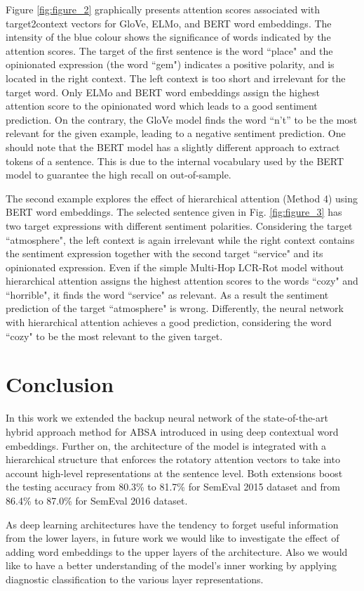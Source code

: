 \documentclass[hidelinks]{llncs}
\begin{document}
Figure \ref{fig:figure_2} graphically presents attention scores associated with target2context vectors for GloVe, ELMo, and BERT word embeddings. The intensity of the blue colour shows the significance of words indicated by the attention scores. The target of the first sentence is the word ``place" and the opinionated expression (the word ``gem") indicates a positive polarity, and is located in the right context. The left context is too short and irrelevant for the target word. Only ELMo and BERT word embeddings assign the highest attention score to the opinionated word which leads to a good sentiment prediction. On the contrary, the GloVe model finds the word ``n't'' to be the most relevant for the given example, leading to a negative sentiment prediction. One should note that the BERT model has a slightly different approach to extract tokens of a sentence. This is due to the internal vocabulary used by the BERT model to guarantee the high recall on out-of-sample.

The second example explores the effect of hierarchical attention (Method 4) using BERT word embeddings. The selected sentence given in Fig. \ref{fig:figure_3} has two target expressions with different sentiment polarities. Considering the target ``atmosphere", the left context is again irrelevant while the right context contains the sentiment expression together with the second target ``service" and its opinionated expression. Even if the simple Multi-Hop LCR-Rot model without hierarchical attention assigns the highest attention scores to the words ``cozy" and ``horrible", it finds the word ``service" as relevant. As a result the sentiment prediction of the target ``atmosphere" is wrong. Differently, the neural network with hierarchical attention achieves a good prediction, considering the word ``cozy" to be the most relevant to the given target.

\section{Conclusion} \label{Conclusion}
In this work we extended the backup neural network of the state-of-the-art hybrid approach method for ABSA introduced in \cite{wallaart2019hybrid} using deep contextual word embeddings. Further on, the architecture of the model is integrated with a hierarchical structure that enforces the rotatory attention vectors to take into account high-level representations at the sentence level. Both extensions boost the testing accuracy from 80.3\% to 81.7\% for SemEval 2015 dataset and from 86.4\% to 87.0\% for SemEval 2016 dataset.




As deep learning architectures have the tendency to forget useful information from the lower layers, in future work we would like to investigate the effect of adding word embeddings to the upper layers of the architecture. Also we would like to have a better understanding of the model's inner working by applying diagnostic classification to the various layer representations.





\end{document}
